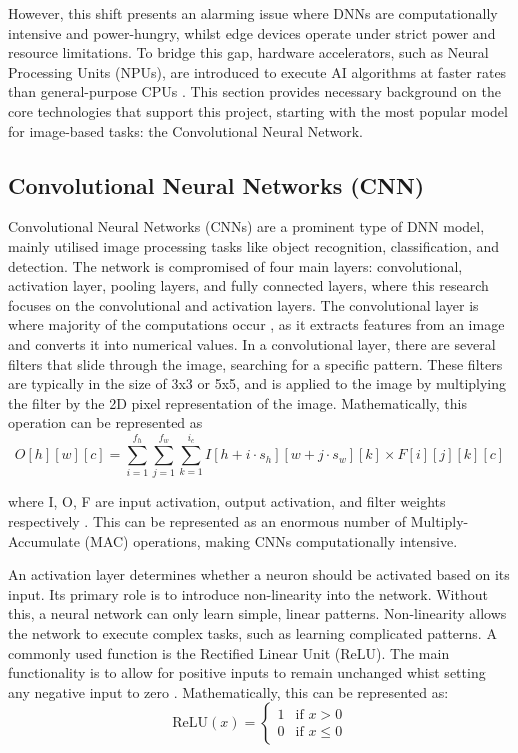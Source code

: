 \documentclass[12pt, a4paper, ukenglish]{article}
\begin{document}
    However, this shift presents an alarming issue where DNNs are computationally intensive and power-hungry, whilst edge devices operate under strict power and resource limitations. To bridge this gap, hardware accelerators, such as Neural Processing Units (NPUs), are introduced to execute AI algorithms at faster rates than general-purpose CPUs \cite{manor_custom_2022}. This section provides necessary background on the core technologies that support this project, starting with the most popular model for image-based tasks: the Convolutional Neural Network.

    \subsection{Convolutional Neural Networks (CNN)} \label{sec:CNN}
    Convolutional Neural Networks (CNNs) are a prominent type of DNN model, mainly utilised image processing tasks like object recognition, classification, and detection. The network is compromised of four main layers: convolutional, activation layer, pooling layers, and fully connected layers, where this research focuses on the convolutional and activation layers.
    The convolutional layer is where majority of the computations occur \cite{choi_enabling_2023}, as it extracts features from an image and converts it into numerical values. In a convolutional layer, there are several filters that slide through the image, searching for a specific pattern. These filters are typically in the size of 3x3 or 5x5, and is applied to the image by multiplying the filter by the 2D pixel representation of the image. Mathematically, this operation can be represented as
    \[
    O[h][w][c] = \sum_{i=1}^{f_h} \sum_{j=1}^{f_w} \sum_{k=1}^{i_c} I[h + i \cdot s_h][w + j \cdot s_w][k] \times F[i][j][k][c]
    \]

    where I, O, F are input activation, output activation, and filter weights respectively \cite{choi_enabling_2023}. This can be represented as an enormous number of Multiply-Accumulate (MAC) operations, making CNNs computationally intensive. 

    An activation layer determines whether a neuron should be activated based on its input. Its primary role is to introduce non-linearity into the network. Without this, a neural network can only learn simple, linear patterns. Non-linearity allows the network to execute complex tasks, such as learning complicated patterns. A commonly used function is the Rectified Linear Unit (ReLU). The main functionality is to allow for positive inputs to remain unchanged whist setting any negative input to zero \cite{parashar_scnn_2017}. Mathematically, this can be represented as:
    \[
    \text{ReLU}(x) = 
    \begin{cases} 
        1 & \text{if } x > 0 \\ 
        0 & \text{if } x \le 0 
    \end{cases}
    \]
\end{document}
